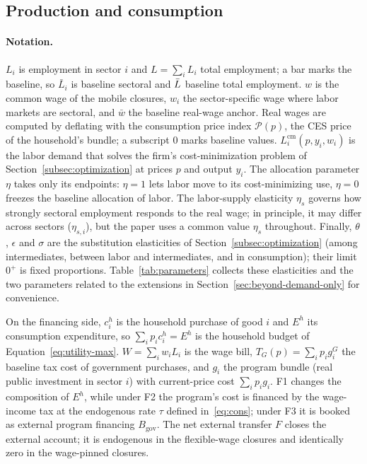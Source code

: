 \subsection{Production and consumption}\label{app:model-kernel}

\paragraph{Notation.} $L_i$ is employment in sector $i$ and $L=\sum_i L_i$ total employment; a bar marks the baseline, so $\bar L_i$ is baseline sectoral and $\bar{L}$ baseline total employment. $w$ is the common wage of the mobile closures, $w_i$ the
sector-specific wage where labor markets are sectoral, and $\bar w$ the baseline real-wage anchor. Real wages are computed by deflating with the consumption price index $\mathcal{P}(p)$, the CES price of the household's bundle; a subscript $0$ marks
baseline values. $L_i^{\mathrm{cm}}(p,y_i,w_i)$ is the labor demand that
solves the firm's cost-minimization problem
of Section~\ref{subsec:optimization} at prices $p$ and output $y_i$. The
allocation parameter $\eta$ takes only its endpoints: $\eta=1$ lets labor
move to its cost-minimizing use, $\eta=0$ freezes the baseline allocation of labor.
The labor-supply elasticity $\eta_s$ governs how strongly sectoral employment
responds to the real wage; in principle, it may differ across sectors ($\eta_{s,i}$), but the paper uses a
common value $\eta_s$ throughout. Finally, $\theta$, $\epsilon$ and $\sigma$ are the
substitution elasticities of Section~\ref{subsec:optimization} (among
intermediates, between labor and intermediates, and in consumption); their
limit $0^{+}$ is fixed proportions. Table~\ref{tab:parameters} collects these elasticities and the two parameters related to the extensions in Section~\ref{sec:beyond-demand-only} for convenience.



On the financing side, $c_i^h$ is the household purchase of good $i$ and
$E^h$ its consumption expenditure, so $\sum_i p_i c_i^h=E^h$ is the
household budget of Equation~\eqref{eq:utility-max}. $W=\sum_i w_i L_i$ is the wage bill, $T_G(p)=\sum_i p_i g_i^G$ the baseline tax cost of government purchases, and $g_i$ the program bundle (real public investment in sector $i$) with current-price cost
$\sum_i p_i g_i$. F1 changes the composition of $E^h$, while under F2 the program's cost is financed by the wage-income tax at the endogenous rate $\tau$ defined in~\eqref{eq:cons}; under F3 it is booked as external program financing $B_{\mathrm{gov}}$. The net external transfer $F$ closes the external account; it is endogenous in the flexible-wage closures and identically zero in the wage-pinned closures.


